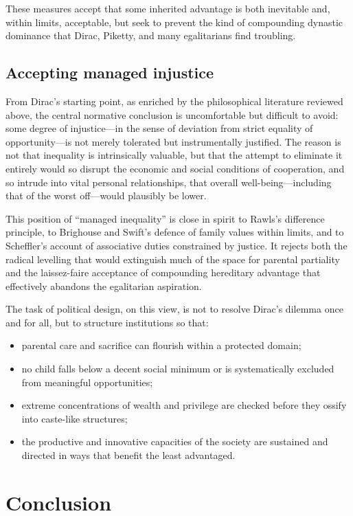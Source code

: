 \documentclass[%
  reprint,
  superscriptaddress,
  amsmath,amssymb,
  pra,
  floatfix,
  longbibliography
]{revtex4-2}
\begin{document}
These measures accept that some inherited advantage is both inevitable
and, within limits, acceptable, but seek to prevent the kind of
compounding dynastic dominance that Dirac, Piketty, and many
egalitarians find troubling.

\subsection{Accepting managed injustice}

From Dirac's starting point, as enriched by the philosophical literature
reviewed above, the central normative conclusion is uncomfortable but
difficult to avoid: some degree of injustice---in the sense of
deviation from strict equality of opportunity---is not merely tolerated
but instrumentally justified.  The reason is not that inequality is
intrinsically valuable, but that the attempt to eliminate it entirely
would so disrupt the economic and social conditions of cooperation, and
so intrude into vital personal relationships, that overall
well-being---including that of the worst off---would plausibly be lower.

This position of ``managed inequality'' is close in spirit to Rawls's
difference principle, to Brighouse and Swift's defence of family
values within limits, and to Scheffler's account of associative duties
constrained by justice.  It rejects both the radical
levelling that would extinguish much of the space for parental
partiality and the laissez-faire acceptance of compounding hereditary
advantage that effectively abandons the egalitarian aspiration.

The task of political design, on this view, is not to resolve Dirac's
dilemma once and for all, but to structure institutions so that:
\begin{itemize}
  \item parental care and sacrifice can flourish within a protected
  domain;
  \item no child falls below a decent social minimum or is
  systematically excluded from meaningful opportunities;
  \item extreme concentrations of wealth and privilege are checked
  before they ossify into caste-like structures;
  \item the productive and innovative capacities of the society are
  sustained and directed in ways that benefit the least advantaged.
\end{itemize}

\section{Conclusion}
\end{document}
